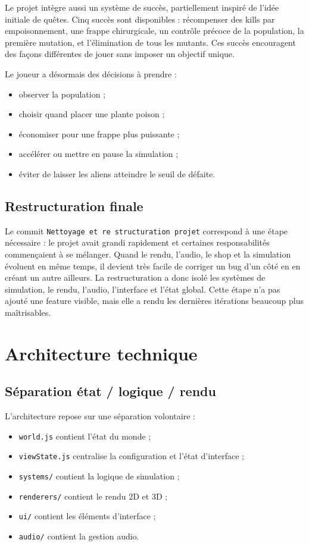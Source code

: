 ﻿\documentclass[11pt,a4paper]{article}
\begin{document}
Le projet intègre aussi un système de succès, partiellement inspiré de l'idée initiale de quêtes. Cinq succès sont disponibles : récompenser des kills par empoisonnement, une frappe chirurgicale, un contrôle précoce de la population, la première mutation, et l'élimination de tous les mutants. Ces succès encouragent des façons différentes de jouer sans imposer un objectif unique.

Le joueur a désormais des décisions à prendre :

\begin{itemize}[noitemsep]
  \item observer la population ;
  \item choisir quand placer une plante poison ;
  \item économiser pour une frappe plus puissante ;
  \item accélérer ou mettre en pause la simulation ;
  \item éviter de laisser les aliens atteindre le seuil de défaite.
\end{itemize}

\subsection{Restructuration finale}

Le commit \texttt{Nettoyage et re structuration projet} correspond à une étape nécessaire : le projet avait grandi rapidement et certaines responsabilités commençaient à se mélanger. Quand le rendu, l'audio, le shop et la simulation évoluent en même temps, il devient très facile de corriger un bug d'un côté en en créant un autre ailleurs. La restructuration a donc isolé les systèmes de simulation, le rendu, l'audio, l'interface et l'état global. Cette étape n'a pas ajouté une feature visible, mais elle a rendu les dernières itérations beaucoup plus maîtrisables.

\section{Architecture technique}

\subsection{Séparation état / logique / rendu}

L'architecture repose sur une séparation volontaire :

\begin{itemize}[noitemsep]
  \item \texttt{world.js} contient l'état du monde ;
  \item \texttt{viewState.js} centralise la configuration et l'état d'interface ;
  \item \texttt{systems/} contient la logique de simulation ;
  \item \texttt{renderers/} contient le rendu 2D et 3D ;
  \item \texttt{ui/} contient les éléments d'interface ;
  \item \texttt{audio/} contient la gestion audio.
\end{itemize}
\end{document}

